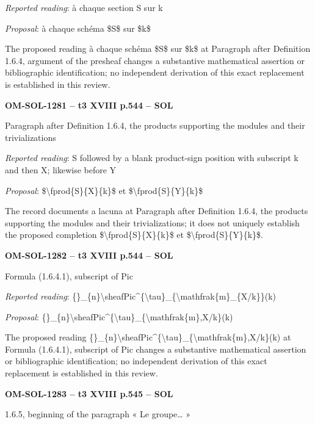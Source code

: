 \emph{Reported reading}: à chaque section S sur k\par
\emph{Proposal}: à chaque schéma \$S\$ sur \$k\$\par
The proposed reading à chaque schéma \$S\$ sur \$k\$ at Paragraph after Definition 1.6.4, argument of the presheaf changes a substantive mathematical assertion or bibliographic identification; no independent derivation of this exact replacement is established in this review.\par
\par\noindent\textbf{OM-SOL-1281 -- t3 XVIII p.544 -- SOL}\par
Paragraph after Definition 1.6.4, the products supporting the modules and their trivializations\par
\emph{Reported reading}: S followed by a blank product-sign position with subscript k and then X; likewise before Y\par
\emph{Proposal}: \$\textbackslash{}fprod\{S\}\{X\}\{k\}\$ et \$\textbackslash{}fprod\{S\}\{Y\}\{k\}\$\par
The record documents a lacuna at Paragraph after Definition 1.6.4, the products supporting the modules and their trivializations; it does not uniquely establish the proposed completion \$\textbackslash{}fprod\{S\}\{X\}\{k\}\$ et \$\textbackslash{}fprod\{S\}\{Y\}\{k\}\$.\par
\par\noindent\textbf{OM-SOL-1282 -- t3 XVIII p.544 -- SOL}\par
Formula (1.6.4.1), subscript of Pic\par
\emph{Reported reading}: \{\}\_\{n\}\textbackslash{}sheafPic\textasciicircum{}\{\textbackslash{}tau\}\_\{\textbackslash{}mathfrak\{m\}\_\{X/k\}\}(k)\par
\emph{Proposal}: \{\}\_\{n\}\textbackslash{}sheafPic\textasciicircum{}\{\textbackslash{}tau\}\_\{\textbackslash{}mathfrak\{m\},X/k\}(k)\par
The proposed reading \{\}\_\{n\}\textbackslash{}sheafPic\textasciicircum{}\{\textbackslash{}tau\}\_\{\textbackslash{}mathfrak\{m\},X/k\}(k) at Formula (1.6.4.1), subscript of Pic changes a substantive mathematical assertion or bibliographic identification; no independent derivation of this exact replacement is established in this review.\par
\par\noindent\textbf{OM-SOL-1283 -- t3 XVIII p.545 -- SOL}\par
1.6.5, beginning of the paragraph « Le groupe… »\par
